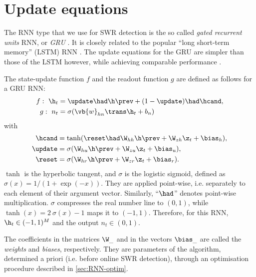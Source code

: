 \section{Update equations}
\label{sec:GRU_eqs}

The RNN type that we use for SWR detection is the so called \emph{gated recurrent units} RNN, or \emph{GRU} \cite{Cho2014}. It is closely related to the popular ``long short-term memory'' (LSTM) RNN \cite{Hochreiter1997,Greff2017}. The update equations for the GRU are simpler than those of the LSTM however, while achieving comparable performance \cite{Chung2014}.

The state-update function $f$ and the readout function $g$ are defined as follows for a GRU RNN:
%
\begin{align}
f:\ \h_t     &= \update \had \h\prev 
                + (1-\update) \had \hcand, \label{eq:hnew}\\
g:\ n_t  &= \sigma( \vb{w}_{hn}\trans \h_t + b_n )      \label{eq:out}
\end{align}
with
\begin{align}
\hcand  &= \tanh( \reset \had \W_{hh} \h\prev 
                   + \W_{zh} \z_t + \bias_h ),  \label{eq:hcand}\\
\update &= \sigma( \W_{hu} \h\prev 
                   + \W_{zu} \z_t + \bias_u),   \label{eq:update}\\
\reset  &= \sigma( \W_{hr} \h\prev 
                   + \W_{zr} \z_t + \bias_r ).  \label{eq:reset}
\end{align}
$\tanh$ is the hyperbolic tangent, and $\sigma$ is the logistic sigmoid, defined as $\sigma(x) = 1 / (1 + \exp(-x))$. They are applied point-wise, i.e. separately to each element of their argument vector. Similarly, ``$\had$'' denotes point-wise multiplication.  $\sigma$ compresses the real number line to $(0, 1)$, while $\tanh(x) = 2\ \sigma(x) - 1$ maps it to $(-1, 1)$. Therefore, for this RNN, $\h_t \in (-1, 1)^M$ and the output $n_t \in (0, 1)$.

The coefficients in the matrices $\W_\_$ and in the vectors $\bias_\_$ are called the \emph{weights} and \emph{biases}, respectively.\footnotemark{} They are parameters of the algorithm, determined a priori (i.e. before online SWR detection), through an optimisation procedure described in \cref{sec:RNN-optim}.



